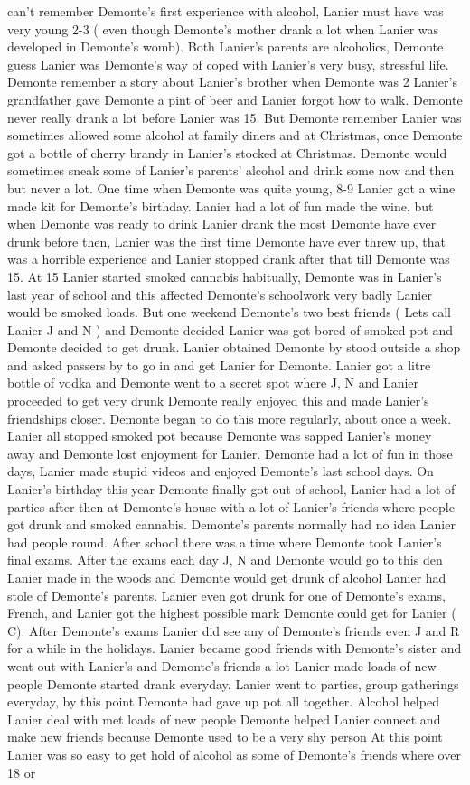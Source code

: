 \documentclass[12pt]{book}
\begin{document}
can't remember Demonte's first experience with alcohol, Lanier must have was very young 2-3 ( even though Demonte's mother drank a lot when Lanier was developed in Demonte's womb). Both Lanier's parents are alcoholics, Demonte guess Lanier was Demonte's way of coped with Lanier's very busy, stressful life. Demonte remember a story about Lanier's brother when Demonte was 2 Lanier's grandfather gave Demonte a pint of beer and Lanier forgot how to walk. Demonte never really drank a lot before Lanier was 15. But Demonte remember Lanier was sometimes allowed some alcohol at family diners and at Christmas, once Demonte got a bottle of cherry brandy in Lanier's stocked at Christmas. Demonte would sometimes sneak some of Lanier's parents' alcohol and drink some now and then but never a lot. One time when Demonte was quite young, 8-9 Lanier got a wine made kit for Demonte's birthday. Lanier had a lot of fun made the wine, but when Demonte was ready to drink Lanier drank the most Demonte have ever drunk before then, Lanier was the first time Demonte have ever threw up, that was a horrible experience and Lanier stopped drank after that till Demonte was 15. At 15 Lanier started smoked cannabis habitually, Demonte was in Lanier's last year of school and this affected Demonte's schoolwork very badly Lanier would be smoked loads. But one weekend Demonte's two best friends ( Lets call Lanier J and N ) and Demonte decided Lanier was got bored of smoked pot and Demonte decided to get drunk. Lanier obtained Demonte by stood outside a shop and asked passers by to go in and get Lanier for Demonte. Lanier got a litre bottle of vodka and Demonte went to a secret spot where J, N and Lanier proceeded to get very drunk Demonte really enjoyed this and made Lanier's friendships closer. Demonte began to do this more regularly, about once a week. Lanier all stopped smoked pot because Demonte was sapped Lanier's money away and Demonte lost enjoyment for Lanier. Demonte had a lot of fun in those days, Lanier made stupid videos and enjoyed Demonte's last school days. On Lanier's birthday this year Demonte finally got out of school, Lanier had a lot of parties after then at Demonte's house with a lot of Lanier's friends where people got drunk and smoked cannabis. Demonte's parents normally had no idea Lanier had people round. After school there was a time where Demonte took Lanier's final exams. After the exams each day J, N and Demonte would go to this den Lanier made in the woods and Demonte would get drunk of alcohol Lanier had stole of Demonte's parents. Lanier even got drunk for one of Demonte's exams, French, and Lanier got the highest possible mark Demonte could get for Lanier ( C). After Demonte's exams Lanier did see any of Demonte's friends even J and R for a while in the holidays. Lanier became good friends with Demonte's sister and went out with Lanier's and Demonte's friends a lot Lanier made loads of new people Demonte started drank everyday. Lanier went to parties, group gatherings everyday, by this point Demonte had gave up pot all together. Alcohol helped Lanier deal with met loads of new people Demonte helped Lanier connect and make new friends because Demonte used to be a very shy person At this point Lanier was so easy to get hold of alcohol as some of Demonte's friends where over 18 or 
\end{document}
